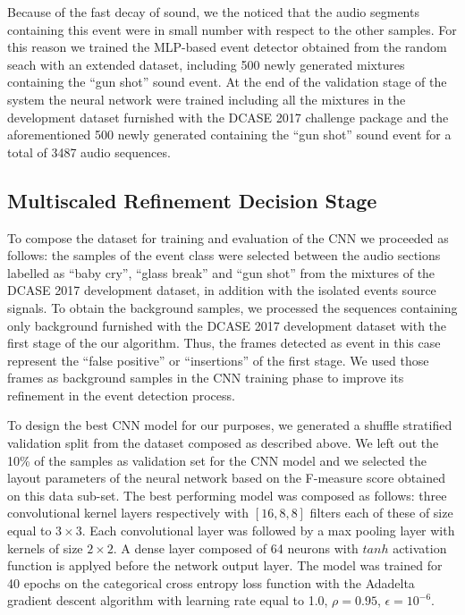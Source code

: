 \documentclass{article}
\begin{document}
\begin{sloppy}
Because of the fast decay of  sound, we the noticed that the audio segments containing this event were in small number with respect to the other samples. For this reason we trained the MLP-based event detector obtained from the random seach with an extended dataset, including 500 newly generated mixtures containing the ``gun shot'' sound event.
At the end of the validation stage of the system the neural network were trained including all the mixtures in the development dataset furnished with the DCASE 2017 challenge package and the aforementioned 500 newly generated containing the ``gun shot'' sound event for a total of 3487 audio sequences.

\subsection{Multiscaled Refinement Decision Stage}

%

To compose the dataset for training and evaluation of the CNN we proceeded as follows: the samples of the event class were selected between the audio sections labelled as ``baby cry'', ``glass break'' and ``gun shot'' from the mixtures of the DCASE 2017 development dataset, in addition with the isolated events source signals. To obtain the background samples, we processed the sequences containing only background furnished with the DCASE 2017 development dataset with the first stage of the our algorithm. Thus, the frames detected as event in this case represent the ``false positive'' or ``insertions'' of the first stage. We used those frames as background samples in the CNN training phase to improve its refinement in the event detection process. 

To design the best CNN model for our purposes, we generated a shuffle stratified validation split from the dataset composed as described above. We left out the 10\% of the samples as validation set for the CNN model and we selected the layout parameters of the neural network based on the F-measure score obtained on this data sub-set. The best performing model was composed as follows: three convolutional kernel layers respectively with $[16, 8, 8]$ filters each of these of size equal to $3\times3$. Each convolutional layer was followed by a max pooling layer with kernels of size $2\times2$. A dense layer composed of 64 neurons with $tanh$ activation function is applyed before the network output layer. The model was trained for 40 epochs on the categorical cross entropy loss function with the Adadelta gradient descent algorithm with learning rate equal to 1.0, $\rho=0.95$, $\epsilon=10^{-6}$.



\end{sloppy}
\end{document}

